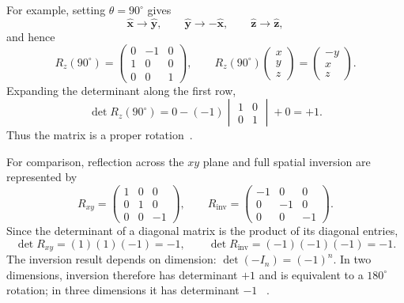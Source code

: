 For example, setting $\theta=90^\circ$ gives
\begin{equation}
    \hat{\mathbf{x}}\to\hat{\mathbf{y}},
    \qquad
    \hat{\mathbf{y}}\to-\hat{\mathbf{x}},
    \qquad
    \hat{\mathbf{z}}\to\hat{\mathbf{z}},
    \label{eq:z90-basis-transformation}
\end{equation}
and hence
\begin{equation}
    R_z(90^\circ)=
    \begin{pmatrix}
        0 & -1 & 0 \\
        1 & 0  & 0 \\
        0 & 0  & 1
    \end{pmatrix},
    \qquad
    R_z(90^\circ)
    \begin{pmatrix}x\\y\\z\end{pmatrix}
    =
    \begin{pmatrix}-y\\x\\z\end{pmatrix}.
    \label{eq:z90-rotation-example}
\end{equation}
Expanding the determinant along the first row,
\begin{equation}
    \det R_z(90^\circ)
    =0-(-1)
    \begin{vmatrix}
        1 & 0 \\
        0 & 1
    \end{vmatrix}
    +0
    =+1.
    \label{eq:z90-rotation-determinant}
\end{equation}
Thus the matrix is a proper rotation~\cite{ee237-week11}.

For comparison, reflection across the $xy$ plane and full spatial inversion
are represented by
\begin{equation}
    R_{xy}=\begin{pmatrix}
        1 & 0 & 0 \\0&1&0\\0&0&-1
    \end{pmatrix},
    \qquad
    R_{\mathrm{inv}}=\begin{pmatrix}
        -1 & 0 & 0 \\0&-1&0\\0&0&-1
    \end{pmatrix}.
    \label{eq:mirror-inversion-matrices}
\end{equation}
Since the determinant of a diagonal matrix is the product of its diagonal
entries,
\begin{equation}
    \det R_{xy}=(1)(1)(-1)=-1,
    \qquad
    \det R_{\mathrm{inv}}=(-1)(-1)(-1)=-1.
    \label{eq:mirror-inversion-determinants}
\end{equation}
The inversion result depends on dimension: $\det(-I_n)=(-1)^n$.  In two
dimensions, inversion therefore has determinant $+1$ and is equivalent to a
$180^\circ$ rotation; in three dimensions it has determinant $-1$
~\cite{ee237-week11}.

